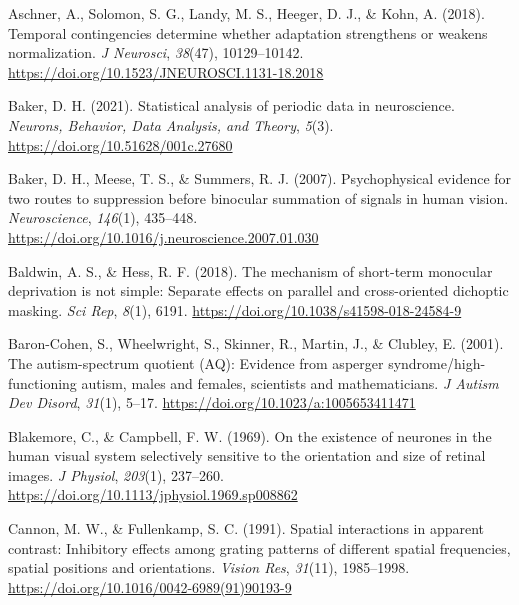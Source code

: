 \documentclass[
]{article}
\newlength{\cslhangindent}
\newlength{\cslentryspacingunit} %
\newenvironment{CSLReferences}[2] %
 {%
  \setlength{\parindent}{0pt}
  \ifodd #1
  \let\oldpar\par
  \def\par{\hangindent=\cslhangindent\oldpar}
  \fi
  \setlength{\parskip}{#2\cslentryspacingunit}
 }%
 {}
\begin{document}
\hypertarget{refs}{}
\begin{CSLReferences}{1}{0}
\leavevmode{}%
Aschner, A., Solomon, S. G., Landy, M. S., Heeger, D. J., \& Kohn, A. (2018). Temporal contingencies determine whether adaptation strengthens or weakens normalization. \emph{J Neurosci}, \emph{38}(47), 10129--10142. \url{https://doi.org/10.1523/JNEUROSCI.1131-18.2018}

\leavevmode{}%
Baker, D. H. (2021). Statistical analysis of periodic data in neuroscience. \emph{Neurons, Behavior, Data Analysis, and Theory}, \emph{5}(3). \url{https://doi.org/10.51628/001c.27680}

\leavevmode{}%
Baker, D. H., Meese, T. S., \& Summers, R. J. (2007). Psychophysical evidence for two routes to suppression before binocular summation of signals in human vision. \emph{Neuroscience}, \emph{146}(1), 435--448. \url{https://doi.org/10.1016/j.neuroscience.2007.01.030}

\leavevmode{}%
Baldwin, A. S., \& Hess, R. F. (2018). The mechanism of short-term monocular deprivation is not simple: Separate effects on parallel and cross-oriented dichoptic masking. \emph{Sci Rep}, \emph{8}(1), 6191. \url{https://doi.org/10.1038/s41598-018-24584-9}

\leavevmode{}%
Baron-Cohen, S., Wheelwright, S., Skinner, R., Martin, J., \& Clubley, E. (2001). The autism-spectrum quotient (AQ): Evidence from asperger syndrome/high-functioning autism, males and females, scientists and mathematicians. \emph{J Autism Dev Disord}, \emph{31}(1), 5--17. \url{https://doi.org/10.1023/a:1005653411471}

\leavevmode{}%
Blakemore, C., \& Campbell, F. W. (1969). On the existence of neurones in the human visual system selectively sensitive to the orientation and size of retinal images. \emph{J Physiol}, \emph{203}(1), 237--260. \url{https://doi.org/10.1113/jphysiol.1969.sp008862}

\leavevmode{}%
Cannon, M. W., \& Fullenkamp, S. C. (1991). Spatial interactions in apparent contrast: Inhibitory effects among grating patterns of different spatial frequencies, spatial positions and orientations. \emph{Vision Res}, \emph{31}(11), 1985--1998. \url{https://doi.org/10.1016/0042-6989(91)90193-9}


\end{CSLReferences}
\end{document}
